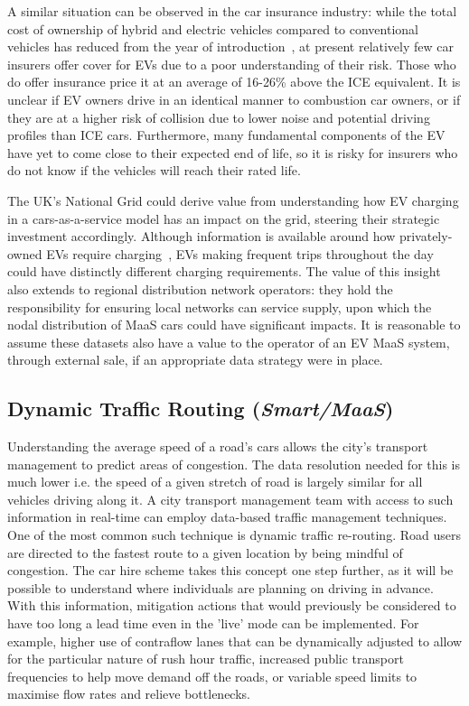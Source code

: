 \documentclass[b5paper,10pt]{article}
\begin{document}
A similar situation can be observed in the car insurance industry:
while the total cost of ownership of hybrid and electric vehicles
compared to conventional vehicles has reduced from the year of
introduction~\cite{palmer-et-al:2018}, at present relatively few car
insurers offer cover for EVs due to a poor understanding of their
risk. Those who do offer insurance price it at an average of 16-26\%
above the ICE equivalent. It is unclear if EV owners drive in an
identical manner to combustion car owners, or if they are at a higher
risk of collision due to lower noise and potential driving profiles
than ICE cars. Furthermore, many fundamental components of the EV have
yet to come close to their expected end of life, so it is risky for
insurers who do not know if the vehicles will reach their rated life.

The UK's National Grid could derive value from understanding how EV
charging in a cars-as-a-service model has an impact on the grid,
steering their strategic investment accordingly.  Although information
is available around how privately-owned EVs require
charging~\citep{kennel-et-al:2012,darabi+ferdowsi:2013}, EVs making
frequent trips throughout the day could have distinctly different
charging requirements. The value of this insight also extends to
regional distribution network operators: they hold the responsibility
for ensuring local networks can service supply, upon which the nodal
distribution of MaaS cars could have significant impacts. It is
reasonable to assume these datasets also have a value to the operator
of an EV MaaS system, through external sale, if an appropriate data
strategy were in place.

\subsection{Dynamic Traffic Routing ({\emph{Smart/MaaS}})} 

Understanding the average speed of a road's cars allows the city's
transport management to predict areas of congestion. The data
resolution needed for this is much lower i.e. the speed of a given
stretch of road is largely similar for all vehicles driving along
it. A city transport management team with access to such information
in real-time can employ data-based traffic management techniques. One
of the most common such technique is dynamic traffic re-routing. Road
users are directed to the fastest route to a given location by being
mindful of congestion. The car hire scheme takes this concept one step
further, as it will be possible to understand where individuals are
planning on driving in advance. With this information, mitigation
actions that would previously be considered to have too long a lead
time even in the 'live' mode can be implemented. For example, higher
use of contraflow lanes that can be dynamically adjusted to allow for
the particular nature of rush hour traffic, increased public
transport frequencies to help move demand off the roads, or variable
speed limits to maximise flow rates and relieve bottlenecks.
\end{document}
